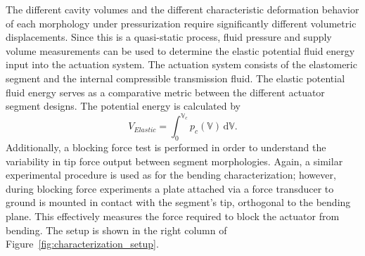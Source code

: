%
The different cavity volumes and the different characteristic deformation behavior of each morphology under pressurization require significantly different volumetric displacements.
%
Since this is a quasi-static process, fluid pressure and supply volume measurements can be used to determine the elastic potential fluid energy input into the actuation system.
%
The actuation system consists of the elastomeric segment and the internal compressible transmission fluid.
%
The elastic potential fluid energy serves as a comparative metric between the different actuator segment designs.
%
The potential energy is calculated by
\begin{equation}\label{eqn:energy}
    V_{Elastic} = \int_0^{\mathbb{V}_c} p_c\left( \mathbb{V} \right) \, \text{d} \mathbb{V}.
\end{equation}
%
Additionally, a blocking force test is performed in order to understand the variability in tip force output between segment morphologies.
%
Again, a similar experimental procedure is used as for the bending characterization; however, during blocking force experiments a plate attached via a force transducer to ground is mounted in contact with the segment's tip, orthogonal to the bending plane.
%
This effectively measures the force required to block the actuator from bending.
%
The setup is shown in the right column of Figure~\ref{fig:characterization_setup}.
%
